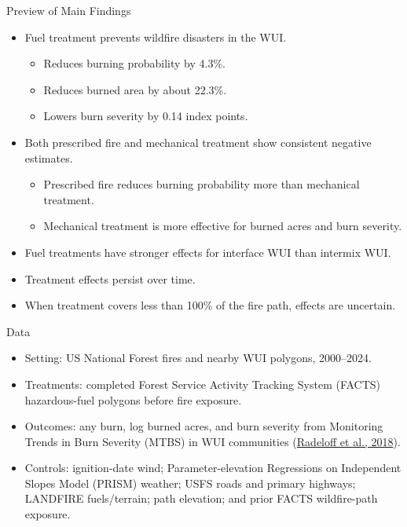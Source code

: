 \documentclass[10pt,aspectratio=169]{beamer}
\newcommand{\citelink}[2]{\textcolor{citationblue}{\hyperlink{#2}{#1}}}
\begin{document}
\begin{frame}{Preview of Main Findings}
  \begin{itemize}
    \item Fuel treatment prevents wildfire disasters in the WUI.
      \begin{itemize}
        \item Reduces burning probability by 4.3\%.
        \item Reduces burned area by about 22.3\%.
        \item Lowers burn severity by 0.14 index points.
      \end{itemize}
    \item Both prescribed fire and mechanical treatment show consistent negative estimates.
      \begin{itemize}
        \item Prescribed fire reduces burning probability more than mechanical treatment.
        \item Mechanical treatment is more effective for burned acres and burn severity.
      \end{itemize}
    \item Fuel treatments have stronger effects for interface WUI than intermix WUI.
    \item Treatment effects persist over time.
    \item When treatment covers less than 100\% of the fire path, effects are uncertain.
  \end{itemize}
\end{frame}

\begin{frame}{Data}
  \begin{itemize}
    \item Setting: US National Forest fires and nearby WUI polygons, 2000--2024.
    \item Treatments: completed Forest Service Activity Tracking System (FACTS) hazardous-fuel polygons before fire exposure.
    \item Outcomes: any burn, log burned acres, and burn severity from Monitoring Trends in Burn Severity (MTBS) in WUI communities (\citelink{Radeloff et al., 2018}{ref:radeloff2018}).
    \item Controls: ignition-date wind; Parameter-elevation Regressions on Independent Slopes Model (PRISM) weather; USFS roads and primary highways; LANDFIRE fuels/terrain; path elevation; and prior FACTS wildfire-path exposure.
  \end{itemize}
\end{frame}
\end{document}
